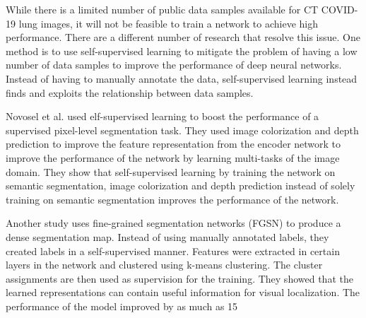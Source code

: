 While there is a limited number of public data samples available for CT COVID-19 lung images,  it will not be feasible to train a network to achieve high performance. There are a different number of research that resolve this issue. One method is to use self-supervised learning to mitigate the problem of having a low number of data samples to improve the performance of deep neural networks. Instead of having to manually annotate the data, self-supervised learning instead finds and exploits the relationship between data samples.

Novosel et al. \cite{ref8} used elf-supervised learning to boost the performance of a supervised pixel-level segmentation task. They used image colorization and depth prediction to improve the feature representation from the encoder network to improve the performance of the network by learning multi-tasks of the image domain. They show that self-supervised learning by training the network on semantic segmentation, image colorization and depth prediction instead of solely training on semantic segmentation improves the performance of the network.

Another study \cite{ref9} uses fine-grained segmentation networks (FGSN) to produce a dense segmentation map. Instead of using manually annotated labels, they created labels in a self-supervised manner. Features were extracted in certain layers in the network and clustered using k-means clustering. The cluster assignments are then used as supervision for the training. They showed that the learned representations can contain useful information for visual localization. The performance of the model improved by as much as 15%

